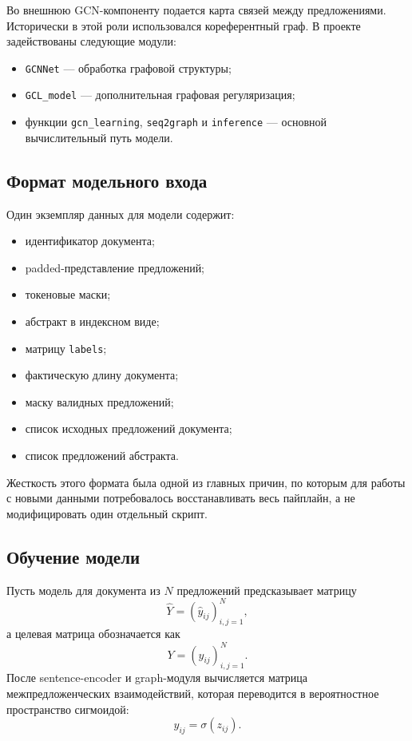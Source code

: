 \documentclass[12pt,a4paper]{article}
\begin{document}
Во внешнюю GCN-компоненту подается карта связей между предложениями. Исторически в этой роли использовался кореферентный граф. В проекте задействованы следующие модули:

\begin{itemize}
    \item \texttt{GCNNet} --- обработка графовой структуры;
    \item \texttt{GCL\_model} --- дополнительная графовая регуляризация;
    \item функции \texttt{gcn\_learning}, \texttt{seq2graph} и \texttt{inference} --- основной вычислительный путь модели.
\end{itemize}

\subsection{Формат модельного входа}

Один экземпляр данных для модели содержит:

\begin{itemize}
    \item идентификатор документа;
    \item padded-представление предложений;
    \item токеновые маски;
    \item абстракт в индексном виде;
    \item матрицу \texttt{labels};
    \item фактическую длину документа;
    \item маску валидных предложений;
    \item список исходных предложений документа;
    \item список предложений абстракта.
\end{itemize}

Жесткость этого формата была одной из главных причин, по которым для работы с новыми данными потребовалось восстанавливать весь пайплайн, а не модифицировать один отдельный скрипт.

\subsection{Обучение модели}

Пусть модель для документа из $N$ предложений предсказывает матрицу
\[
\hat{Y} = (\hat{y}_{ij})_{i,j=1}^{N},
\]
а целевая матрица обозначается как
\[
Y = (y_{ij})_{i,j=1}^{N}.
\]
После sentence-encoder и graph-модуля вычисляется матрица межпредложенческих взаимодействий, которая переводится в вероятностное пространство сигмоидой:
\[
\hat{y}_{ij} = \sigma(z_{ij}).
\]
\end{document}
